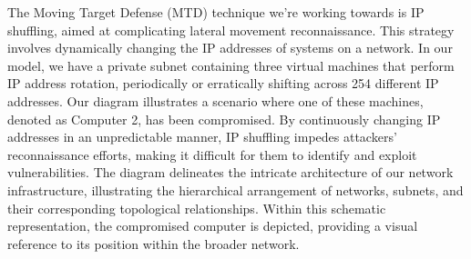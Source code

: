 The Moving Target Defense (MTD) technique we're working towards is IP shuffling, aimed at complicating lateral movement reconnaissance. This strategy involves dynamically changing the IP addresses of systems on a network. In our model, we have a private subnet containing three virtual machines that perform IP address rotation, periodically or erratically shifting across 254 different IP addresses.
Our diagram illustrates a scenario where one of these machines, denoted as Computer 2, has been compromised. By continuously changing IP addresses in an unpredictable manner, IP shuffling impedes attackers' reconnaissance efforts, making it difficult for them to identify and exploit vulnerabilities. The diagram delineates the intricate architecture of our network infrastructure, illustrating the hierarchical arrangement of networks, subnets, and their corresponding topological relationships. Within this schematic representation, the compromised computer is depicted, providing a visual reference to its position within the broader network.